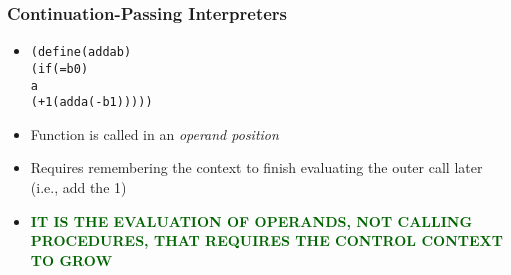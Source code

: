 \documentclass{beamer}
\begin{document}
\begin{frame}[fragile]
\frametitle{Continuation-Passing Interpreters}
\begin{scriptsize}
\begin{itemize}
\item<1->
\begin{alltt}
(define (add a b)
  (if (= b 0)
      a
      (+ 1 (add a (- b 1)))))
\end{alltt}

\item<1-> Function is called in an \emph{operand position}

\item<1-> Requires remembering the context to finish evaluating the outer call later (i.e., add the 1)


\item<2-> \textcolor{darkgreen}{\textbf{IT IS THE EVALUATION OF OPERANDS, NOT CALLING PROCEDURES, THAT REQUIRES THE CONTROL CONTEXT TO GROW}}

\end{itemize}
\end{scriptsize}
\end{frame}
\end{document}
